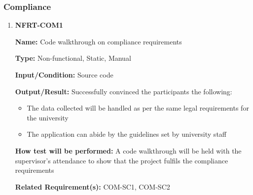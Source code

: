 \documentclass[12pt, titlepage]{article}
\begin{document}
\subsubsection{Compliance}
\begin{enumerate}
\item{\textbf{NFRT-COM1}}

\textbf{Name:} Code walkthrough on compliance requirements

\textbf{Type:} Non-functional, Static, Manual

\textbf{Input/Condition:} Source code

\textbf{Output/Result:} Successfully convinced the participants the following:
\begin{itemize}
\item The data collected will be handled as per the same legal requirements for the university
\item The application can abide by the guidelines set by university staff
\end{itemize}

\textbf{How test will be performed:} A code walkthrough will be held with the supervisor's attendance to show that the project fulfils the compliance requirements

\textbf{Related Requirement(s):} COM-SC1, COM-SC2
\end{enumerate}
\end{document}
